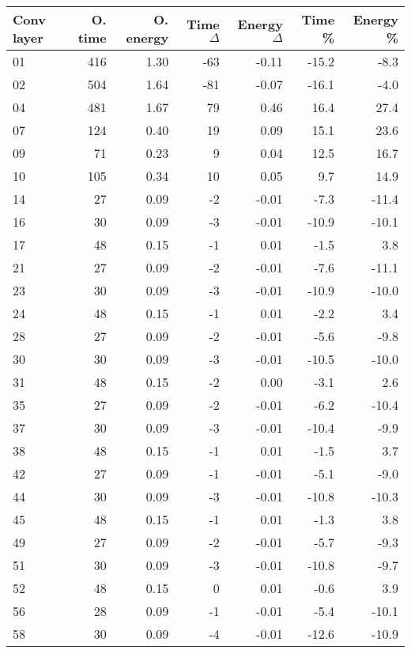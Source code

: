 \begin{table}
\centering
\begin{tabular}{|l|r|r|r|r|r|r|}
\hline
Conv layer & O. time & O. energy & Time $\Delta$ & Energy $\Delta$ & Time \% & Energy \% \\\hline
01 & 416 & 1.30 & -63 & -0.11 & -15.2 & -8.3 \\\hline
02 & 504 & 1.64 & -81 & -0.07 & -16.1 & -4.0 \\\hline
04 & 481 & 1.67 & 79 & 0.46 & 16.4 & 27.4 \\\hline
07 & 124 & 0.40 & 19 & 0.09 & 15.1 & 23.6 \\\hline
09 & 71 & 0.23 & 9 & 0.04 & 12.5 & 16.7 \\\hline
10 & 105 & 0.34 & 10 & 0.05 & 9.7 & 14.9 \\\hline
14 & 27 & 0.09 & -2 & -0.01 & -7.3 & -11.4 \\\hline
16 & 30 & 0.09 & -3 & -0.01 & -10.9 & -10.1 \\\hline
17 & 48 & 0.15 & -1 & 0.01 & -1.5 & 3.8 \\\hline
21 & 27 & 0.09 & -2 & -0.01 & -7.6 & -11.1 \\\hline
23 & 30 & 0.09 & -3 & -0.01 & -10.9 & -10.0 \\\hline
24 & 48 & 0.15 & -1 & 0.01 & -2.2 & 3.4 \\\hline
28 & 27 & 0.09 & -2 & -0.01 & -5.6 & -9.8 \\\hline
30 & 30 & 0.09 & -3 & -0.01 & -10.5 & -10.0 \\\hline
31 & 48 & 0.15 & -2 & 0.00 & -3.1 & 2.6 \\\hline
35 & 27 & 0.09 & -2 & -0.01 & -6.2 & -10.4 \\\hline
37 & 30 & 0.09 & -3 & -0.01 & -10.4 & -9.9 \\\hline
38 & 48 & 0.15 & -1 & 0.01 & -1.5 & 3.7 \\\hline
42 & 27 & 0.09 & -1 & -0.01 & -5.1 & -9.0 \\\hline
44 & 30 & 0.09 & -3 & -0.01 & -10.8 & -10.3 \\\hline
45 & 48 & 0.15 & -1 & 0.01 & -1.3 & 3.8 \\\hline
49 & 27 & 0.09 & -2 & -0.01 & -5.7 & -9.3 \\\hline
51 & 30 & 0.09 & -3 & -0.01 & -10.8 & -9.7 \\\hline
52 & 48 & 0.15 & 0 & 0.01 & -0.6 & 3.9 \\\hline
56 & 28 & 0.09 & -1 & -0.01 & -5.4 & -10.1 \\\hline
58 & 30 & 0.09 & -4 & -0.01 & -12.6 & -10.9 \\\hline

\end{tabular}
\end{table}
